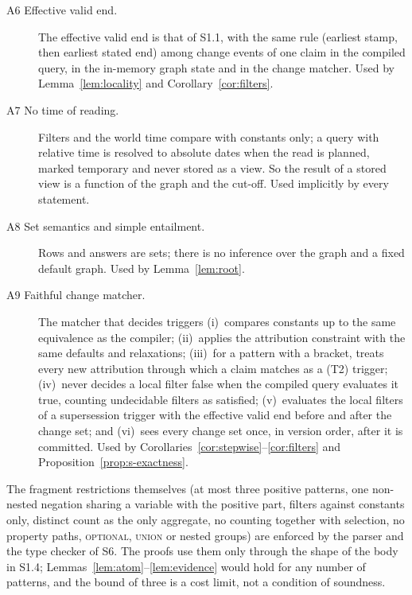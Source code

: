 \begin{description}
\item[A6 Effective valid end.] The effective valid end is that of S1.1, with the same rule
  (earliest stamp, then earliest stated end) among change events of one claim in the compiled
  query, in the in-memory graph state and in the change matcher. Used by Lemma~\ref{lem:locality} and
  Corollary~\ref{cor:filters}.
\item[A7 No time of reading.] Filters and the world time compare with constants only; a query with
  relative time is resolved to absolute dates when the read is planned, marked temporary and never
  stored as a view. So the result of a stored view is a function of the graph and the cut-off.
  Used implicitly by every statement.
\item[A8 Set semantics and simple entailment.] Rows and answers are sets; there is no inference
  over the graph and a fixed default graph. Used by Lemma~\ref{lem:root}.
\item[A9 Faithful change matcher.] The matcher that decides triggers (i)~compares constants up to
  the same equivalence as the compiler; (ii)~applies the attribution constraint with the same
  defaults and relaxations; (iii)~for a pattern with a bracket, treats every new attribution through
  which a claim matches as a (T2) trigger; (iv)~never decides a local filter false when the compiled
  query evaluates it true, counting undecidable filters as satisfied; (v)~evaluates the local filters
  of a supersession trigger with the effective valid end before and after the change set; and
  (vi)~sees every change set once, in version order, after it is committed. Used by
  Corollaries~\ref{cor:stepwise}--\ref{cor:filters} and Proposition~\ref{prop:s-exactness}.
\end{description}

\noindent The fragment restrictions themselves (at most three positive patterns, one non-nested
negation sharing a variable with the positive part, filters against constants only, distinct count
as the only aggregate, no counting together with selection, no property paths, \textsc{optional},
\textsc{union} or nested groups) are enforced by the parser and the type checker of S6. The proofs
use them only through the shape of the body in S1.4; Lemmas~\ref{lem:atom}--\ref{lem:evidence}
would hold for any number of patterns, and the bound of three is a cost limit, not a condition of
soundness.
